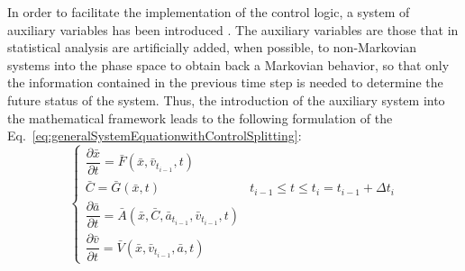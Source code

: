 \documentclass{mc2013}
\begin{document}
In order to facilitate the implementation of the control logic, a system of auxiliary variables has been introduced .
The auxiliary variables are those that in statistical analysis are artificially added, when possible, to non-Markovian systems into the phase space to obtain back a Markovian behavior, so that only the information contained in the previous time step is needed to determine the future status of the system.
Thus, the introduction of the auxiliary system into the mathematical framework leads to the following formulation of the Eq.~\ref{eq:generalSystemEquationwithControlSplitting}:
\begin{equation}
\begin{cases} 
\dfrac{\partial \bar{x}}{\partial t} = \bar{F}(\bar{x},\bar{v}_{t_{i-1}},t) \\
\bar{C} = \bar{G}(\bar{x},t) & t_{i-1}\leq t\leq t_{i} = t_{i-1} + \Delta t_{i} \\ 
\dfrac{\partial \bar{a}}{\partial t} = \bar{A}(\bar{x},\bar{C},\bar{a}_{t_{i-1}},\bar{v}_{t_{i-1}},t) \\
\dfrac{\partial \bar{v}}{\partial t} = \bar{V}(\bar{x},\bar{v}_{t_{i-1}},\bar{a},t) 
\end{cases}
\label{eq:generalSystemEquationwithControlSplittingAndAux}
\end{equation}


\end{document}
